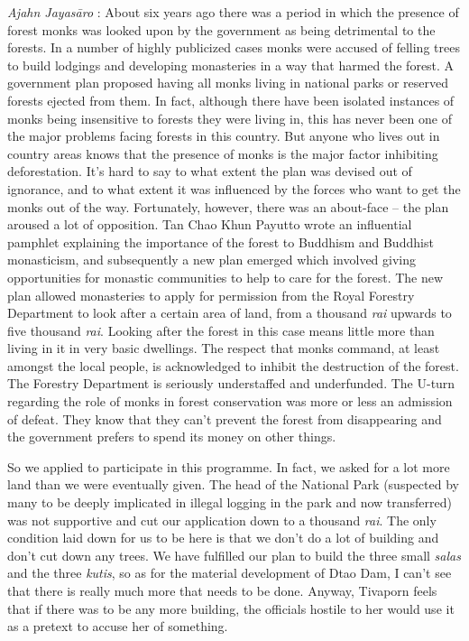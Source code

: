 \emph{Ajahn Jayasāro }: About six years ago there was a period in which
the presence of forest monks was looked upon by the government as being
detrimental to the forests. In a number of highly publicized cases monks
were accused of felling trees to build lodgings and developing
monasteries in a way that harmed the forest. A government plan proposed
having all monks living in national parks or reserved forests ejected
from them. In fact, although there have been isolated instances of monks
being insensitive to forests they were living in, this has never been
one of the major problems facing forests in this country. But anyone who
lives out in country areas knows that the presence of monks is the major
factor inhibiting deforestation. It's hard to say to what extent the
plan was devised out of ignorance, and to what extent it was influenced
by the forces who want to get the monks out of the way. Fortunately,
however, there was an about-face -- the plan aroused a lot of
opposition. Tan Chao Khun Payutto wrote an influential pamphlet
explaining the importance of the forest to Buddhism and Buddhist
monasticism, and subsequently a new plan emerged which involved giving
opportunities for monastic communities to help to care for the forest.
The new plan allowed monasteries to apply for permission from the Royal
Forestry Department to look after a certain area of land, from a
thousand \emph{rai} upwards to five thousand \emph{rai}. Looking after
the forest in this case means little more than living in it in very
basic dwellings. The respect that monks command, at least amongst the
local people, is acknowledged to inhibit the destruction of the forest.
The Forestry Department is seriously understaffed and underfunded. The
U-turn regarding the role of monks in forest conservation was more or
less an admission of defeat. They know that they can't prevent the
forest from disappearing and the government prefers to spend its money
on other things.

So we applied to participate in this programme. In fact, we asked for a
lot more land than we were eventually given. The head of the National
Park (suspected by many to be deeply implicated in illegal logging in
the park and now transferred) was not supportive and cut our application
down to a thousand \emph{rai}. The only condition laid down for us to be
here is that we don't do a lot of building and don't cut down any trees.
We have fulfilled our plan to build the three small \emph{salas} and the
three \emph{kutis}, so as for the material development of Dtao Dam, I
can't see that there is really much more that needs to be done. Anyway,
Tivaporn feels that if there was to be any more building, the officials
hostile to her would use it as a pretext to accuse her of something.

